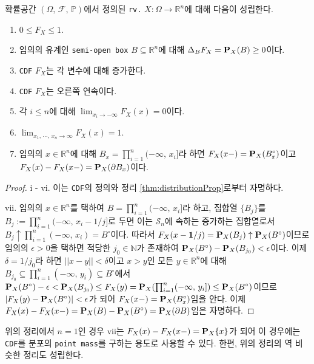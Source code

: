\begin{theorem}
    확률공간 $(\Omega,\,\mathcal{F},\,\mathbb{P})$에서 정의된 \texttt{rv.} $X:\Omega\to\mathbb{R}^n$에 대해 다음이 성립한다.
    \begin{enumerate}
        \item $0\leq F_X\leq 1$.
        \item 임의의 유계인 \texttt{semi-open box} $B\subseteq\mathbb{R}^n$에 대해 $\Delta_BF_X=\mathbf{P}_X(B)\geq0$이다.
        \item \texttt{CDF} $F_X$는 각 변수에 대해 증가한다.
        \item \texttt{CDF} $F_X$는 오른쪽 연속이다.
        \item 각 $i\leq n$에 대해 $\lim_{x_i\to-\infty}F_X(x)=0$이다.\footnotemark
        \item $\lim_{x_1,\,\cdots,\,x_n\to\infty}F_X(x)=1$.\footnotemark
        \item 임의의 $x\in\mathbb{R}^n$에 대해 $B_x=\prod_{i=1}^n(-\infty,\,x_i]$라 하면 $F_X(x-)=\mathbf{P}_X(B_x^\circ)$이고 $F_X(x)-F_X(x-)=\mathbf{P}_X(\partial B_x)$이다.\footnotemark
    \end{enumerate}
\end{theorem}

\begin{proof}
    i - vi. 이는 \texttt{CDF}의 정의와 정리 \ref{thm:distributionProp}로부터 자명하다.
    
    vii. 임의의 $x\in\mathbb{R}^n$를 택하여 $B=\prod_{i=1}^n(-\infty,\,x_i]$라 하고, 집합열 $\{B_j\}$를 $B_j:=\prod_{i=1}^n(-\infty,\,x_i-1/j]$로 두면 이는 $\mathcal{S}_n$에 속하는 증가하는 집합열로서 $B_j\uparrow\prod_{i=1}^n(-\infty,\,x_i)=B^\circ$이다. 따라서 $F_X(x-\mathbf{1}/j)=\mathbf{P}_X(B_j)\uparrow\mathbf{P}_X(B^\circ)$이므로 임의의 $\epsilon>0$을 택하면 적당한 $j_0\in\mathbb{N}$가 존재하여 $\mathbf{P}_X(B^\circ)-\mathbf{P}_X(B_{j_0})<\epsilon$이다. 이제 $\delta=1/j_0$라 하면 $||x-y||<\delta$이고 $x>y$인 모든 $y\in\mathbb{R}^n$에 대해 $B_{j_0}\subseteq\prod_{i=1}^n(-\infty,\,y_i)\subseteq B^\circ$에서 $\mathbf{P}_X(B^\circ)-\epsilon<\mathbf{P}_X(B_{j_0})\leq F_X(y)=\mathbf{P}_X(\prod_{i=1}^n(-\infty,\,y_i])\leq\mathbf{P}_X(B^\circ)$이므로 $|F_X(y)-\mathbf{P}_X(B^\circ)|<\epsilon$가 되어 $F_X(x-)=\mathbf{P}_X(B_x^\circ)$임을 안다. 이제 $F_X(x)-F_X(x-)=\mathbf{P}_X(B)-\mathbf{P}_X(B^\circ)=\mathbf{P}_X(\partial B)$임은 자명하다.
\end{proof}

위의 정리에서 $n=1$인 경우 vii는 $F_X(x)-F_X(x-)=\mathbf{P}_X\{x\}$가 되어 이 경우에는 \texttt{CDF}를 분포의 \texttt{point mass}를 구하는 용도로 사용할 수 있다. 한편, 위의 정리의 역 비슷한 정리도 성립한다.

